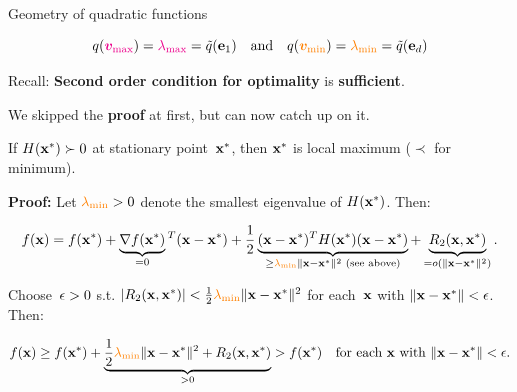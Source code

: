 \documentclass[11pt,compress,t,notes=noshow, xcolor=table]{beamer}
\begin{document}
\begin{vbframe}{Geometry of quadratic functions}
\begin{itemize}
\begin{footnotesize}
            \vspace{-0.5\baselineskip}

            \begin{equation*}
                q(\textcolor{magenta}{\bm{v}_\text{max}}) = \textcolor{magenta}{\lambda_\text{max}} = \tilde{q}(\mathbf{e}_1) \quad\text{and}\quad q(\textcolor{orange}{\bm{v}_\text{min}}) = \textcolor{orange}{\lambda_\text{min}} = \tilde{q}(\mathbf{e}_d)
            \end{equation*}
        \end{footnotesize}
\end{itemize}

Recall: \textbf{Second order condition for optimality} is \textbf{sufficient}.

\medskip

We skipped the \textbf{proof} at first, but can now catch up on it.

\begin{kframe}
    \footnotesize
     If $H(\mathbf{x}^\ast) \succ 0$ at stationary point~$\mathbf{x}^\ast$, then $\mathbf{x}^\ast$ is local maximum ($\prec$ for minimum).

     \medskip

    \textbf{Proof:}
    Let $\textcolor{orange}{\lambda_\text{min}}>0$ denote the smallest eigenvalue of $H(\mathbf{x}^\ast)$.
    Then:
    
    \vspace{-1.25\baselineskip}
    
    \begin{equation*}
        f(\mathbf{x}) = f(\mathbf{x}^\ast) + \underbrace{\nabla f(\mathbf{x}^\ast)}_{=0}{}^T(\mathbf{x}-\mathbf{x}^\ast) + \frac{1}{2}\underbrace{(\mathbf{x}-\mathbf{x}^\ast)^T H(\mathbf{x}^\ast)(\mathbf{x}-\mathbf{x}^\ast)}_{\geq \textcolor{orange}{\lambda_\text{min}} \|\mathbf{x}-\mathbf{x}^\ast\|^2 \text{ (see above)}} + \underbrace{R_2(\mathbf{x},\mathbf{x}^\ast)}_{=o(\|\mathbf{x}-\mathbf{x}^\ast\|^2)}.
    \end{equation*}

    Choose~$\epsilon>0$ s.t. $|R_2(\mathbf{x},\mathbf{x}^\ast)| < \frac{1}{2} \textcolor{orange}{\lambda_\text{min}} \|\mathbf{x}-\mathbf{x}^\ast\|^2$ for each~$\mathbf{x}$ with $\|\mathbf{x}-\mathbf{x}^\ast\|<\epsilon$.
    Then:

    \vspace{-1.25\baselineskip}

    \begin{equation*}
        f(\mathbf{x}) \geq f(\mathbf{x}^\ast) + \underbrace{\frac{1}{2} \textcolor{orange}{\lambda_\text{min}} \|\mathbf{x}-\mathbf{x}^\ast\|^2 + R_2(\mathbf{x},\mathbf{x}^\ast)}_{>0} > f(\mathbf{x}^\ast) \quad\text{for each $\mathbf{x}$ with $\|\mathbf{x}-\mathbf{x}^\ast\|<\epsilon$}.
    \end{equation*}
\end{kframe}


\end{vbframe}
\end{document}
